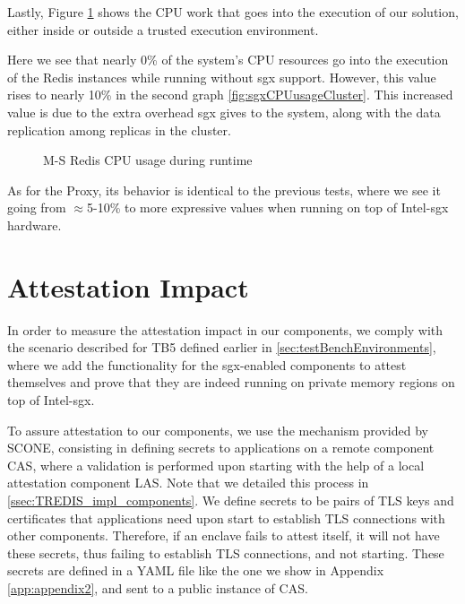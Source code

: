Lastly, Figure \ref{fig:cpuUsageCluster} shows the CPU work that goes into the execution of our solution, either inside or outside a trusted execution environment. 

Here we see that nearly 0\% of the system's CPU resources go into the execution of the Redis instances while running without \gls{sgx} support. However, this value rises to nearly 10\% in the second graph \ref{fig:sgxCPUusageCluster}. This increased value is due to the extra overhead \gls{sgx} gives to the system, along with the data replication among replicas in the cluster.

\begin{figure}[htbp]
	\centering
	\caption{M-S Redis CPU usage during runtime}
	\label{fig:cpuUsageCluster}
\end{figure}

As for the Proxy, its behavior is identical to the previous tests, where we see it going from $\approx$5-10\% to more expressive values when running on top of Intel-\gls{sgx} hardware.

\section{Attestation Impact}

In order to measure the attestation impact in our components, we comply with the scenario described for TB5 defined earlier in \ref{sec:testBenchEnvironments}, where we add the functionality for the \gls{sgx}-enabled components to attest themselves and prove that they are indeed running on private memory regions on top of Intel-\gls{sgx}. 

To assure attestation to our components, we use the mechanism provided by SCONE, consisting in defining secrets to applications on a remote component CAS, where a validation is performed upon starting with the help of a local attestation component LAS. Note that we detailed this process in \ref{ssec:TREDIS_impl_components}. 
We define secrets to be pairs of TLS keys and certificates that applications need upon start to establish TLS connections with other components. Therefore, if an enclave fails to attest itself, it will not have these secrets, thus failing to establish TLS connections, and not starting. These secrets are defined in a YAML file like the one we show in Appendix \ref{app:appendix2}, and sent to a public instance of CAS. 

